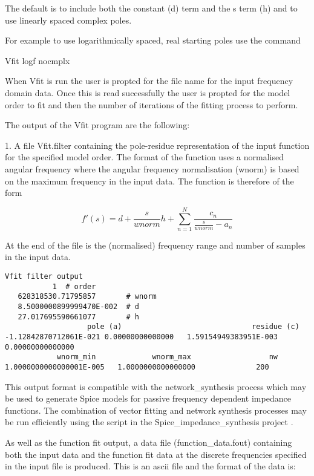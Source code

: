 The default is to include both the constant (d) term and the s term (h) and to use linearly spaced complex poles.

For example to use logarithmically spaced, real starting poles use the command

Vfit logf nocmplx

When Vfit is run the user is propted for the file name for the input frequency domain data. Once this is read successfully the user is propted for the model order to fit and then the number of iterations of the fitting process to perform.

The output of the Vfit program are the following:

1. A file Vfit.filter containing the pole-residue representation of the input function for the specified model order.
The format of the function uses a normalised angular frequency where the angular frequency normalisation (wnorm) is based on the
maximum frequency in the input data. The function is therefore of the form

\begin{equation}\label{eq:vf1}
f' \left( s \right) = d+\frac{s}{wnorm} h+\sum_{n=1}^N \frac{c_n}{\frac{s}{wnorm}-a_n} 
\end{equation} 

At the end of the file is the (normalised) frequency range and number of samples in the input data.

\begin{small}
\begin{verbatim}
Vfit filter output
           1  # order
   628318530.71795857       # wnorm
   8.5000000899999470E-002  # d
   27.017695590661077       # h
                   pole (a)                              residue (c)
-1.12842870712061E-021 0.00000000000000   1.59154949383951E-003 0.00000000000000     
            wnorm_min             wnorm_max                  nw
1.0000000000000001E-005   1.0000000000000000              200
\end{verbatim}
\end{small}

This output format is compatible with the network\_synthesis process \cite{netowrk_synthesis} which may be used to generate Spice models for passive frequency dependent impedance functions. The combination of vector fitting and network synthesis processes may be run efficiently using the script in the Spice\_impedance\_synthesis project \cite{spice_impedance_synthesis}.

As well as the function fit output, a data file (function\_data.fout) containing both the input data and the function fit data at the discrete frequencies specified in the input file is produced. This is an ascii file and the format of the data is:

